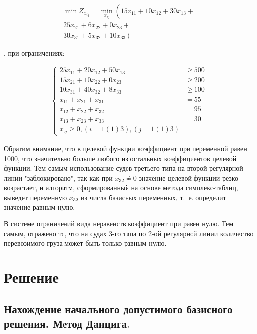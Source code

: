 \vspace{-\baselineskip}\begin{align*}
\min Z_{x_{ij}} = \min_{x_{ij}} \left( \right.15x_{11}+10x_{12}+30x_{13}+ \\
	25x_{21}+6x_{22}+0x_{23}+ \\
	30x_{31}+5x_{32}+10x_{33}\left. \right)
\end{align*}

, при ограничениях:

\vspace{-\baselineskip}\begin{align*}
\begin{cases}25x_{11} +20x_{12} +50x_{13} &\geqslant 500 \\ 
		15x_{21} +10x_{22} +0x_{23} &\geqslant 200 \\ 
		10x_{31} +40x_{32} +8x_{33} &\geqslant 100 \\ 
		x_{11} +x_{21} +x_{31} &= 55\\ 
		x_{12} +x_{22} +x_{32} &= 95\\ 
		x_{13} +x_{23} +x_{33} &= 30\\ 
		x_{ij} \geqslant 0, (i=1(1)3), (j=1(1)3)
	\end{cases}
\end{align*}


Обратим внимание, что в целевой функции коэффициент при переменной равен 1000,
что значительно больше любого из остальных коэффициентов целевой функции.
Тем самым использование судов третьего типа на второй регулярной линии "заблокировано",
так как при $x_{32} \neq 0$ значение целевой функции резко возрастает, и алгоритм,
сформированный на основе метода симплекс-таблиц, выведет переменную $x_{32}$ из числа базисных переменных,
т.~е. определит значение  равным нулю.

В системе ограничений вида неравенств коэффициент при  равен нулю. Тем самым, отражено то,
что на судах 3-го типа по 2-ой регулярной линии количество перевозимого груза может быть только равным нулю.


\section{Решение}

\subsection{Нахождение начального допустимого базисного решения. Метод Данцига.}

